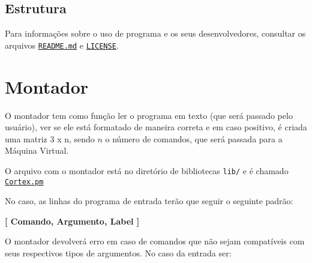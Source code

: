 \documentclass[a4paper]{article}
\begin{document}
    \subsection{Estrutura}
      
        Para informações sobre o uso de programa e os seus 
        desenvolvedores, consultar os arquivos \href{run:../README.md}
        {\texttt{README.md}} e \href{run:../LICENSE}{\texttt{LICENSE}}.
    

\newpage %

\section{Montador} \label{sec:montador}

    O montador tem como função ler o programa em texto (que será 
    passado pelo usuário), ver se ele está formatado de maneira 
    correta e em caso positivo, é criada uma matriz 3 x n, sendo $n$ 
    o número de comandos, que será passada para a Máquina Virtual.
    
    O arquivo com o montador está no diretório de bibliotecas 
    \texttt{lib/} e é chamado \href{run:../lib/Cortex.pm}
    {\texttt{Cortex.pm}}
    
    \bigskip\bigskip
    
    No caso, as linhas do programa de entrada terão que seguir o 
    seguinte padrão:

    \begin{center}
        \textbf{[ Comando, Argumento, Label ]}
    \end{center}
    
    O montador devolverá erro em caso de comandos que não sejam 
    compatíveis com seus respectivos tipos de argumentos. No caso da
    entrada ser: 
    
\end{document}
